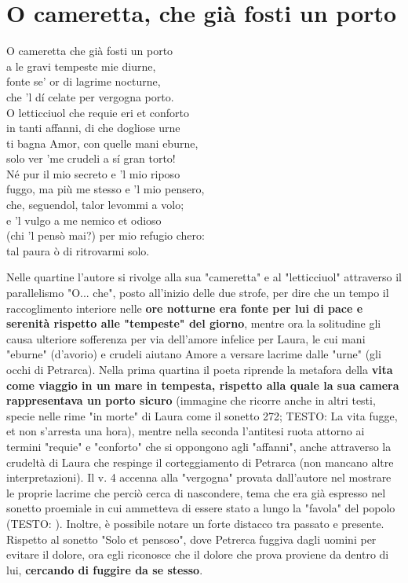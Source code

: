 \documentclass[10pt,a4paper]{article}
\begin{document}
\section{O cameretta, che già fosti un porto}

\begin{estratto}
	O cameretta che già fosti un porto\\
	a le gravi tempeste mie diurne,\\
	fonte se’ or di lagrime nocturne,\\
	che ’l dí celate per vergogna porto.\\
	
	O letticciuol che requie eri et conforto\\
	in tanti affanni, di che dogliose urne\\
	ti bagna Amor, con quelle mani eburne,\\
	solo ver ’me crudeli a sí gran torto!\\
	
	Né pur il mio secreto e ’l mio riposo\\
	fuggo, ma più me stesso e ’l mio pensero,\\
	che, seguendol, talor levommi a volo;\\
	
	e ’l vulgo a me nemico et odioso\\
	(chi ’l pensò mai?) per mio refugio chero:\\
	tal paura ò di ritrovarmi solo.\\
\end{estratto}

Nelle quartine l'autore si rivolge alla sua "cameretta" e al "letticciuol" attraverso il parallelismo "O... che", posto all'inizio delle due strofe, per dire che un tempo il raccoglimento interiore nelle \textbf{ore notturne era fonte per lui di pace e serenità rispetto alle "tempeste" del giorno}, mentre ora la solitudine gli causa ulteriore sofferenza per via dell'amore infelice per Laura, le cui mani "eburne" (d'avorio) e crudeli aiutano Amore a versare lacrime dalle "urne" (gli occhi di Petrarca). Nella prima quartina il poeta riprende la metafora della \textbf{vita come viaggio in un mare in tempesta, rispetto alla quale la sua camera rappresentava un porto sicuro} (immagine che ricorre anche in altri testi, specie nelle rime "in morte" di Laura come il sonetto 272; TESTO: La vita fugge, et non s'arresta una hora), mentre nella seconda l'antitesi ruota attorno ai termini "requie" e "conforto" che si oppongono agli "affanni", anche attraverso la crudeltà di Laura che respinge il corteggiamento di Petrarca (non mancano altre interpretazioni). Il v. 4 accenna alla "vergogna" provata dall'autore nel mostrare le proprie lacrime che perciò cerca di nascondere, tema che era già espresso nel sonetto proemiale in cui ammetteva di essere stato a lungo la "favola" del popolo (TESTO: ). Inoltre, è possibile notare un forte distacco tra passato e presente. Rispetto al sonetto "Solo et pensoso", dove Petrerca fuggiva dagli uomini per evitare il dolore, ora egli riconosce che il dolore che prova proviene da dentro di lui, \textbf{cercando di fuggire da se stesso}.
\end{document}
